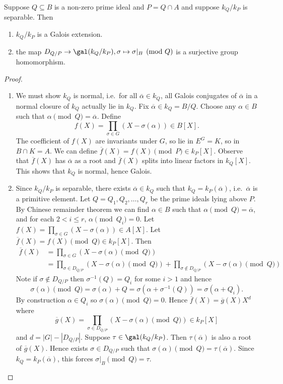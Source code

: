 \documentclass[a4paper]{article}
\begin{document}
\begin{proposition}
  Suppose \(Q \subseteq B\) is a non-zero prime ideal and \(P = Q \cap A\) and suppose \(k_Q/k_P\) is separable. Then
  \begin{enumerate}
  \item \(k_Q/k_P\) is a Galois extension.
  \item the map \(D_{Q/P} \to \gal(k_Q/k_P), \sigma \mapsto \sigma|_B \pmod Q\) is a surjective group homomorphism.
  \end{enumerate}
\end{proposition}

\begin{proof}\leavevmode
  \begin{enumerate}
  \item We must show \(k_Q\) is normal, i.e.\ for all \(\overline \alpha \in k_Q\), all Galois conjugates of \(\overline \alpha\) in a normal closure of \(k_Q\) actually lie in \(k_Q\). Fix \(\overline \alpha \in k_Q = B/Q\). Choose any \(\alpha \in B\) such that \(\alpha \pmod Q = \overline \alpha\). Define
    \[
      f(X) = \prod_{\sigma \in G} (X - \sigma(\alpha)) \in B[X].
    \]
    The coefficient of \(f(X)\) are invariants under \(G\), so lie in \(E^G = K\), so in \(B \cap K = A\). We can define \(\overline f(X) = f(X) \pmod P \in k_P[X]\). Observe that \(\overline f(X)\) has \(\overline \alpha\) as a root and \(\overline f(X)\) splits into linear factors in \(k_Q[X]\). This shows that \(k_Q\) is normal, hence Galois.
  \item Since \(k_Q/k_P\) is separable, there exists \(\overline \alpha \in k_Q\) such that \(k_Q = k_P(\overline \alpha)\), i.e.\ \(\overline \alpha\) is a primitive element. Let \(Q = Q_1, Q_2, \dots, Q_r\) be the prime ideals lying above \(P\). By Chinese remainder theorem we can find \(\alpha \in B\) such that \(\alpha \pmod Q = \overline \alpha\), and for each \(2 < i \leq r\), \(\alpha \pmod{Q_i} = 0\). Let \(f(X) = \prod_{\sigma \in G}(X - \sigma(\alpha)) \in A[X]\). Let \(\overline f(X) = f(X) \pmod Q \in k_P[X]\). Then
    \begin{align*}
      \overline f(X)
      &= \prod_{\sigma \in G} (X - \sigma(\alpha) \pmod Q) \\
      &= \prod_{\sigma \in D_{Q/P}} (X - \sigma (\alpha) \pmod Q)
      + \prod_{\sigma \notin D_{Q/P}} (X - \sigma (\alpha) \pmod Q)
    \end{align*}
    Note if \(\sigma \notin D_{Q/P}\) then \(\sigma^{-1}(Q) = Q_i\) for some \(i > 1\) and hence
    \[
      \sigma(\alpha) \pmod Q = \sigma(\alpha) + Q= \sigma(\alpha + \sigma^{-1}(Q)) = \sigma(\alpha + Q_i).
    \]
    By construction \(\alpha \in Q_i\) so \(\sigma(\alpha) \pmod Q = 0\). Hence \(\overline f(X) = \overline g(X) X^d\) where
    \[
      \overline g(X) = \prod_{\sigma \in D_{Q/P}} (X - \sigma(\alpha) \pmod Q) \in k_P[X]
    \]
    and \(d = |G| - |D_{Q/P}|\). Suppose \(\tau \in \gal(k_Q/k_P)\). Then \(\tau(\overline \alpha)\) is also a root of \(\overline g(X)\). Hence exists \(\sigma \in D_{Q/P}\) such that \(\sigma(\alpha) \pmod Q = \tau(\overline \alpha)\). Since \(k_Q = k_P(\overline \alpha)\), this forces \(\sigma|_B \pmod Q = \tau\).
  \end{enumerate}
\end{proof}
\end{document}
